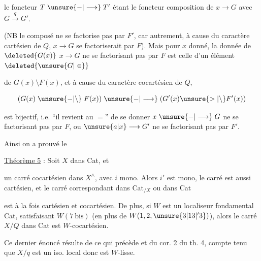 le foncteur $T\mathrel{\unsure{-|\longrightarrow}}T'$ étant le foncteur composition de $x\longrightarrow G$ avec $G\xrightarrow{q}G'$.

 (NB le composé ne se factorise pas par $F'$, car autrement, à cause du caractère cartésien de $Q$, $x\longrightarrow G$ se factoriserait par $F$). Mais pour $x$ donné, la donnée de $\deleted{G(x)}$ $x\longrightarrow G$ ne se factorisant pas par $F$ est celle d'un élément $\deleted{\unsure{G|\in}}$

de $G(x)\setminus F(x)$, et à cause du caractère cocartésien de $Q$,

\[
(G(x)\mathrel{\unsure{-|\setminus}}F(x))\mathrel{\unsure{-|\longrightarrow}}(G'(x)\unsure{>|\setminus}F'(x))
\]

est bijectif, i.e. ``il revient au $=$'' de se donner $x\mathrel{\unsure{-|\longrightarrow}}G$ ne se factorisant pas par $F$, ou $\unsure{a|x}\longrightarrow G'$ ne se factorisant pas par $F'$.

Ainsi on a prouvé le

\uline{Théorème 5} : Soit $X$ dans Cat, et


un carré cocartésien dans $X^\wedge$, avec $i$ mono. Alors $i'$ est mono, le carré  est aussi cartésien, et le carré correspondant dans $\mathrm{Cat}_{/X}$ ou dans Cat


est à la fois cartésien et cocartésien. De plus, si $W$ est un localiseur fondamental  Cat, satisfaisant  $W(7\ \mathrm{bis})$ (en plus de $W(1,2,\unsure{3|13|{}'3})$), alors le  carré $X/Q$ dans Cat est $W$-cocartésien.

Ce dernier énoncé résulte de ce qui précède et du cor. 2 du th. 4, compte tenu que $X/q$ est un iso. local donc est $W$-lisse.

